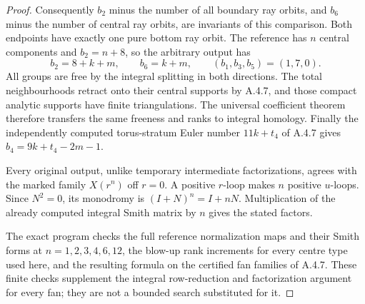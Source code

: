 \begin{proof}
Consequently $b_2$ minus the number of all boundary
ray orbits, and $b_6$ minus the number of central ray
orbits, are invariants of this comparison. Both
endpoints have exactly one pure bottom ray orbit.
The reference has $n$ central components and
$b_2=n+8$, so the arbitrary output has
\[
 b_2=8+k+m,\qquad b_6=k+m,
 \qquad (b_1,b_3,b_5)=(1,7,0).
\]
All groups are free by the integral splitting in both
directions. The total neighbourhoods retract onto
their central supports by A.4.7, and those compact
analytic supports have finite triangulations. The
universal coefficient theorem therefore transfers
the same freeness and ranks to integral homology.
Finally the independently computed torus-stratum
Euler number $11k+t_4$ of A.4.7 gives
$b_4=9k+t_4-2m-1$.

Every original output, unlike temporary intermediate
factorizations, agrees with the marked family
$X(r^n)$ off $r=0$. A positive $r$-loop makes $n$
positive $u$-loops. Since $N^2=0$, its monodromy is
$(I+N)^n=I+nN$. Multiplication of the already computed
integral Smith matrix by $n$ gives the stated factors.

The exact program 
checks the full reference normalization maps and their
Smith forms at $n=1,2,3,4,6,12$, the blow-up rank
increments for every centre type used here, and the
resulting formula on the certified fan families of
A.4.7. These finite checks supplement the integral
row-reduction and factorization argument for every
fan; they are not a bounded search substituted for it.
\end{proof}
